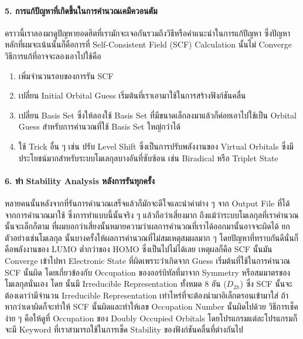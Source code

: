 \paragraph{5. การแก้ปัญหาที่เกิดขึ้นในการคำนวณเคมีควอนตัม}
%
คราวนี้เราลองมาดูปัญหายอดฮิตที่เรามักจะเจอกันรวมถึงวิธีหรือคำแนะนำในการแก้ปัญหา ซึ่งปัญหาหลักที่ผมจะเน้นนั้นก็คือการที่ Self-Consistent Field (SCF) Calculation นั้นไม่ Converge วิธีการแก้ที่อาจจะลองเอาไปใช้คือ
%
\begin{enumerate}[topsep=0pt,noitemsep]
  \setlength\itemsep{0.5em}
  \item เพิ่มจำนวนรอบของการรัน SCF

  \item เปลี่ยน Initial Orbital Guess เริ่มต้นที่เราเอามาใช้ในการสร้างฟังก์ชันคลื่น

  \item เปลี่ยน Basis Set ซึ่งให้ลองใช้ Basis Set ที่มีขนาดเล็กลงมาแล้วก็ค่อยเอาไปใช้เป็น Orbital Guess สำหรับการคำนวณที่ใช้ Basis Set ใหญ่กว่าได้

  \item ใช้ Trick อื่น ๆ เช่น ปรับ Level Shift ซึ่งเป็นการปรับพลังงานของ Virtual Orbitals ซึ่งมีประโยชน์มากสำหรับระบบโมเลกุลบางอันที่ซับซ้อน เช่น Biradical หรือ Triplet State
\end{enumerate}

\paragraph{6. ทำ Stability Analysis หลังการรันทุกครั้ง}
%
หลายคนนั้นหลังจากที่รันการคำนวณเสร็จแล้วก็มักจะดีใจและนำค่าต่าง ๆ จาก Output File ที่ได้จากการคำนวณมาใช้ ซึ่งการทำแบบนี้นั้นจริง ๆ แล้วถือว่าเสี่ยงมาก ถึงแม้ว่าระบบโมเลกุลที่เราคำนวณนั้นจะเล็กก็ตาม ที่ผมบอกว่าเสี่ยงนั้นหมายความว่าผลการคำนวณที่เราได้ออกมานั้นอาจจะผิดได้ ยกตัวอย่างเช่นโมเลกุล  นั้นบางครั้งให้ผลการคำนวณที่ไม่สมเหตุสมผลมาก ๆ โดยปัญหาที่ทราบกันดีนั่นก็คือพลังงานของ LUMO ต่ำกว่าของ HOMO ซึ่งเป็นไปไม่ได้เลย เหตุผลก็คือ SCF นั้นมัน Converge เข้าไปหา Electronic State ที่ผิดเพราะว่าเกิดจาก Guess เริ่มต้นที่ใช้ในการคำนวณ SCF นั้นผิด โดยเกี่ยวข้องกับ Occupation ของออร์บิทัลที่มาจาก Symmetry หรือสมมาตรของโมเลกุลนั่นเอง โดย  นั้นมี Irreducible Representation ทั้งหมด 8 อัน ($D_{2h}$) ซึ่ง SCF นั้นจะต้องเดาว่ามีจำนวน Irreducible Representation เท่าไหร่ที่จะต้องนำมาอิเล็กตรอนเข้ามาใส่ ถ้าหากว่าเดาผิดก็จะทำให้ SCF นั้นผิดและทำให้เลข Occupation Number นั้นผิดไปด้วย วิธีการเช็คง่าย ๆ คือให้ดูที่ Occupation ของ Doubly Occupied Orbitals โดยโปรแกรมแต่ละโปรแกรมก็จะมี Keyword ที่เราสามารถใช้ในการเช็ค Stability ของฟังก์ชันคลื่นที่ต่างกันไป


